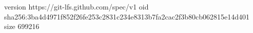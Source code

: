 version https://git-lfs.github.com/spec/v1
oid sha256:3ba4d4971f852f26fe253c2831c234e8313b7fa2cac2f3b80cb062815e14d401
size 699216
